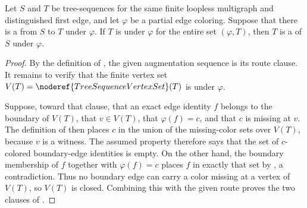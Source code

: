 \begin{lemma}
Let $S$ and $T$ be tree-sequences for the same finite loopless multigraph
and distinguished first edge, and let $\varphi$ be a partial edge coloring.
Suppose that there is a
 from $S$ to $T$ under $\varphi$.
If $T$ is  under $\varphi$ for the entire set
$(\varphi,T)$, then $T$ is a
 of $S$ under $\varphi$.
\end{lemma}
\begin{proof}
By the definition of , the given augmentation
sequence is its route clause.  It remains to verify that the finite vertex
set $V(T)=\noderef{TreeSequenceVertexSet}(T)$ is
 under $\varphi$.

Suppose, toward that clause, that an exact edge identity $f$ belongs to the
boundary of $V(T)$, that $v\in V(T)$, that $\varphi(f)=c$, and that $c$ is
missing at $v$.  The definition of  then places
$c$ in the union of the missing-color sets over $V(T)$, because $v$ is a
witness.  The assumed  property therefore says
that the set of $c$-colored boundary-edge identities is empty.  On the other
hand, the boundary membership of $f$ together with $\varphi(f)=c$ places
$f$ in exactly that set by , a contradiction.
Thus no boundary edge can carry a color missing at a vertex of $V(T)$, so
$V(T)$ is closed.  Combining this with the given route proves the two
clauses of .
\end{proof}
